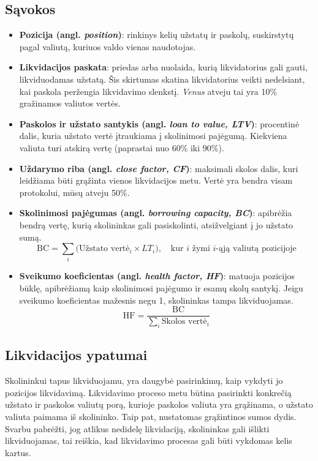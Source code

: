 \documentclass[]{VUMIFTemplateClass}
\begin{document}
\subsection{Sąvokos}
\begin{itemize}
  \item \textbf{Pozicija (angl. \textit{position})}: rinkinys kelių užstatų ir paskolų, suskirstytų pagal valiutą, kuriuos valdo vienas naudotojas.
  \item \textbf{Likvidacijos paskata}: priedas arba nuolaida, kurią likvidatorius gali gauti, likviduodamas užstatą.
  Šis skirtumas skatina likvidatorius veikti nedelsiant, kai paskola peržengia likvidavimo slenkstį. \textit{Venus} atveju tai yra 10\% gražinamos valiutos vertės.
  \item \textbf{Paskolos ir užstato santykis (angl. \textit{loan to value, LTV})}: procentinė dalis, kuria užstato vertė įtraukiama į skolinimosi pajėgumą. Kiekviena valiuta turi atskirą vertę (paprastai nuo 60\% iki 90\%). 
  \item \textbf{Uždarymo riba (angl. \textit{close factor, CF})}: maksimali skolos dalis, kuri leidžiama būti grąžinta vienos likvidacijos metu. Vertė yra bendra visam protokolui, mūsų atveju 50\%.
  \item \textbf{Skolinimosi pajėgumas (angl. \textit{borrowing capacity, BC})}: apibrėžia bendrą vertę, kurią skolininkas gali pasiskolinti, atsižvelgiant į jo užstato sumą.
    \[
    \text{BC} = \sum_{i} \bigl(\text{Užstato vertė}_{i} \times LT_{i}\bigr), \quad \text{kur } i \text{ žymi } i\text{-ąją valiutą pozicijoje}
    \]
  \item \textbf{Sveikumo koeficientas (angl. \textit{health factor, HF})}: matuoja pozicijos būklę, apibrėžiamą kaip skolinimosi pajėgumo ir esamų skolų santykį. Jeigu sveikumo koeficientas mažesnis negu 1, skolininkas tampa likviduojamas.
  \[
  \text{HF} = \frac{\text{BC}}{\sum_{i} \text{Skolos vertė}_{i}}
  \]
\end{itemize}

\subsection{Likvidacijos ypatumai}

Skolininkui tapus likviduojamu, yra daugybė pasirinkimų, kaip vykdyti jo pozicijos likvidavimą. Likvidavimo proceso metu būtina pasirinkti konkrečią užstato ir paskolos valiutų porą, kurioje paskolos valiuta yra grąžinama, o užstato valiuta paimama iš skolininko. Taip pat, nustatomas grąžintinos sumos dydis. Svarbu pabrėžti, jog atlikus nedidelę likvidaciją, skolininkas gali išlikti likviduojamas, tai reiškia, kad likvidavimo procesas gali būti vykdomas kelis kartus.
\end{document}
